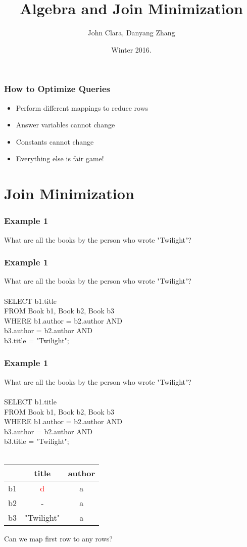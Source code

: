 \documentclass{beamer}
\begin{document}
\title{Algebra and Join Minimization}
\author{John Clara, Danyang Zhang}
\date[WI 2016]{Winter 2016.}

\subject{Algebra and Join Minimization}

\begin{frame}
  \titlepage
\end{frame}

\begin{frame}
  \frametitle{How to Optimize Queries}
  \begin{itemize}
    \item Perform different mappings to reduce rows
    \item Answer variables cannot change
    \item Constants cannot change
    \item Everything else is fair game!
  \end{itemize}
\end{frame}

\section{Join Minimization}
\begin{frame}
  \frametitle{Example 1}
  What are all the books by the person who wrote "Twilight"?
\end{frame}

\begin{frame}
  \frametitle{Example 1}
  What are all the books by the person who wrote "Twilight"?\\
  \hfill \\
  SELECT b1.title\\
  FROM Book b1, Book b2, Book b3\\
  WHERE b1.author = b2.author AND\\
        b3.author = b2.author AND\\
        b3.title = "Twilight";\\
\end{frame}

\begin{frame}
  \frametitle{Example 1}
  What are all the books by the person who wrote "Twilight"?\\
  \hfill \\
  SELECT b1.title\\
  FROM Book b1, Book b2, Book b3\\
  WHERE b1.author = b2.author AND\\
        b3.author = b2.author AND\\
        b3.title = "Twilight";\\
  \hfill \\
  \begin{tabular}{ c | c c }
  & title & author \\
  \hline
   b1 & \textcolor{red}{d} & a \\
   b2 & -         & a \\
   b3 & "Twilight" & a \\
  \end{tabular}
  Can we map first row to any rows?
\end{frame}
\end{document}

